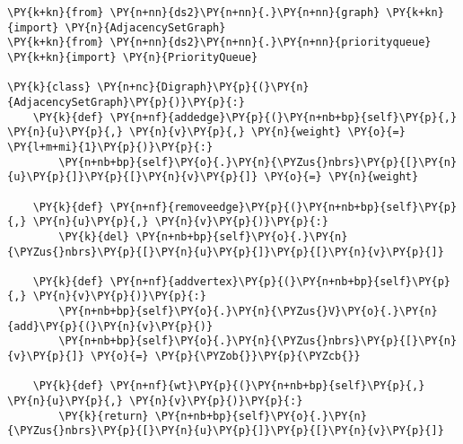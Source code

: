\begin{Verbatim}[commandchars=\\\{\}]
\PY{k+kn}{from} \PY{n+nn}{ds2}\PY{n+nn}{.}\PY{n+nn}{graph} \PY{k+kn}{import} \PY{n}{AdjacencySetGraph}
\PY{k+kn}{from} \PY{n+nn}{ds2}\PY{n+nn}{.}\PY{n+nn}{priorityqueue} \PY{k+kn}{import} \PY{n}{PriorityQueue}

\PY{k}{class} \PY{n+nc}{Digraph}\PY{p}{(}\PY{n}{AdjacencySetGraph}\PY{p}{)}\PY{p}{:}
    \PY{k}{def} \PY{n+nf}{addedge}\PY{p}{(}\PY{n+nb+bp}{self}\PY{p}{,} \PY{n}{u}\PY{p}{,} \PY{n}{v}\PY{p}{,} \PY{n}{weight} \PY{o}{=} \PY{l+m+mi}{1}\PY{p}{)}\PY{p}{:}
        \PY{n+nb+bp}{self}\PY{o}{.}\PY{n}{\PYZus{}nbrs}\PY{p}{[}\PY{n}{u}\PY{p}{]}\PY{p}{[}\PY{n}{v}\PY{p}{]} \PY{o}{=} \PY{n}{weight}

    \PY{k}{def} \PY{n+nf}{removeedge}\PY{p}{(}\PY{n+nb+bp}{self}\PY{p}{,} \PY{n}{u}\PY{p}{,} \PY{n}{v}\PY{p}{)}\PY{p}{:}
        \PY{k}{del} \PY{n+nb+bp}{self}\PY{o}{.}\PY{n}{\PYZus{}nbrs}\PY{p}{[}\PY{n}{u}\PY{p}{]}\PY{p}{[}\PY{n}{v}\PY{p}{]}

    \PY{k}{def} \PY{n+nf}{addvertex}\PY{p}{(}\PY{n+nb+bp}{self}\PY{p}{,} \PY{n}{v}\PY{p}{)}\PY{p}{:}
        \PY{n+nb+bp}{self}\PY{o}{.}\PY{n}{\PYZus{}V}\PY{o}{.}\PY{n}{add}\PY{p}{(}\PY{n}{v}\PY{p}{)}
        \PY{n+nb+bp}{self}\PY{o}{.}\PY{n}{\PYZus{}nbrs}\PY{p}{[}\PY{n}{v}\PY{p}{]} \PY{o}{=} \PY{p}{\PYZob{}}\PY{p}{\PYZcb{}}

    \PY{k}{def} \PY{n+nf}{wt}\PY{p}{(}\PY{n+nb+bp}{self}\PY{p}{,} \PY{n}{u}\PY{p}{,} \PY{n}{v}\PY{p}{)}\PY{p}{:}
        \PY{k}{return} \PY{n+nb+bp}{self}\PY{o}{.}\PY{n}{\PYZus{}nbrs}\PY{p}{[}\PY{n}{u}\PY{p}{]}\PY{p}{[}\PY{n}{v}\PY{p}{]}
\end{Verbatim}


